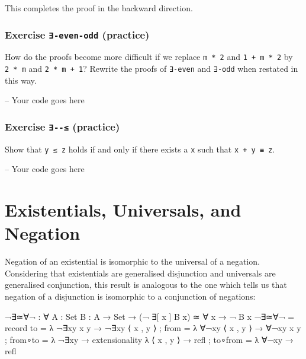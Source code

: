 This completes the proof in the backward direction.

\hypertarget{exercise--even-odd-practice}{%
\subsubsection{\texorpdfstring{Exercise \texttt{∃-even-odd}
(practice)}{Exercise ∃-even-odd (practice)}}\label{exercise--even-odd-practice}}

How do the proofs become more difficult if we replace \texttt{m\ *\ 2}
and \texttt{1\ +\ m\ *\ 2} by \texttt{2\ *\ m} and
\texttt{2\ *\ m\ +\ 1}? Rewrite the proofs of \texttt{∃-even} and
\texttt{∃-odd} when restated in this way.

\begin{fence}
\begin{code}
-- Your code goes here
\end{code}
\end{fence}

\hypertarget{exercise----practice}{%
\subsubsection{\texorpdfstring{Exercise \texttt{∃-\textbar{}-≤}
(practice)}{Exercise ∃-\textbar-≤ (practice)}}\label{exercise----practice}}

Show that \texttt{y\ ≤\ z} holds if and only if there exists a
\texttt{x} such that \texttt{x\ +\ y\ ≡\ z}.

\begin{fence}
\begin{code}
-- Your code goes here
\end{code}
\end{fence}

\hypertarget{existentials-universals-and-negation}{%
\section{Existentials, Universals, and
Negation}\label{existentials-universals-and-negation}}

Negation of an existential is isomorphic to the universal of a negation.
Considering that existentials are generalised disjunction and universals
are generalised conjunction, this result is analogous to the one which
tells us that negation of a disjunction is isomorphic to a conjunction
of negations:

\begin{fence}
\begin{code}
¬∃≃∀¬ : ∀ {A : Set} {B : A → Set}
  → (¬ ∃[ x ] B x) ≃ ∀ x → ¬ B x
¬∃≃∀¬ =
  record
    { to      =  λ{ ¬∃xy x y → ¬∃xy ⟨ x , y ⟩ }
    ; from    =  λ{ ∀¬xy ⟨ x , y ⟩ → ∀¬xy x y }
    ; from∘to =  λ{ ¬∃xy → extensionality λ{ ⟨ x , y ⟩ → refl } }
    ; to∘from =  λ{ ∀¬xy → refl }
    }
\end{code}
\end{fence}

